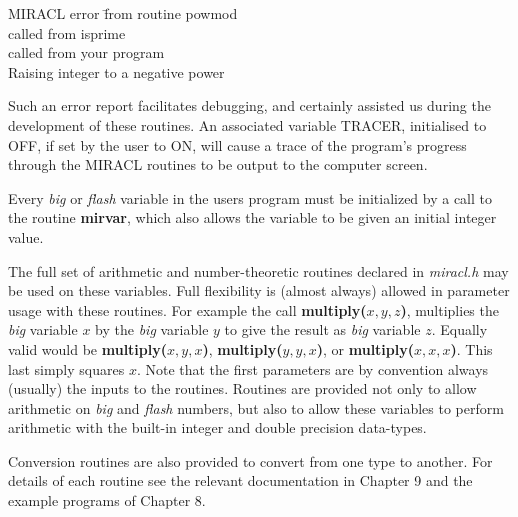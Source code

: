      \begin{center}
      \begin{tabbing}

                    MIRACL error \=from routine powmod      \\
                                 \>called from isprime      \\
                                 \>called from your program \\
                    Raising integer to a negative power     
      \end{tabbing}
      \end{center}

      Such an error report facilitates debugging, and certainly assisted us 
      during  the  development  of  these routines.  An associated variable 
      TRACER,  initialised to OFF,  if set by the user to ON,  will cause a 
      trace  of  the  program's  progress through the MIRACL routines to be 
      output to the computer screen.  

      Every {\em big}  or  {\em flash}  variable  in  the  users  program  
      must be initialized by a call to the routine {\bf mirvar}, which also 
      allows the variable to be given an initial integer value.  

      The full set of arithmetic and number-theoretic routines declared  in 
      {\em miracl.h}  may  be  used  on  these  variables.  Full flexibility 
      is (almost always) allowed in parameter usage with these  routines.  For 
      example the call {\bf multiply($x,y,z$)},  multiplies the {\em big} 
      variable $x$  by the {\em big} variable $y$ to give the result as {\em 
      big} variable $z$.  Equally valid would be {\bf multiply($x,y,x$)}, {\bf 
      multiply($y,y,x$)}, or {\bf multiply($x,x,x$)}.  
      This last simply squares $x$.  Note that the first  parameters  are  by 
      convention  always (usually) the inputs to the routines.  Routines are provided 
      not only to allow arithmetic on {\em big} and {\em flash} numbers,  but  
      also to  allow  these  variables  to  perform arithmetic with the 
      built-in integer and double precision data-types.  

      Conversion routines are also provided to convert  from  one  type  to 
      another.  For  details of each routine see the relevant documentation 
      in Chapter 9 and the example programs of Chapter 8.  

